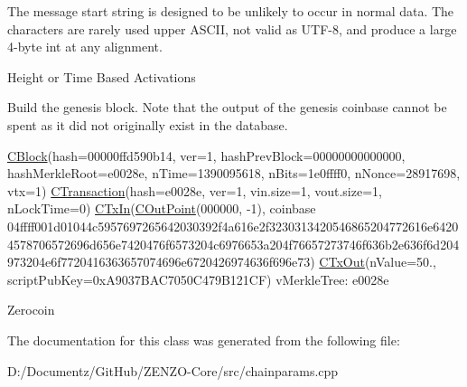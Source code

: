 The message start string is designed to be unlikely to occur in normal data. The characters are rarely used upper A\+S\+C\+II, not valid as U\+T\+F-\/8, and produce a large 4-\/byte int at any alignment.

Height or Time Based Activations

Build the genesis block. Note that the output of the genesis coinbase cannot be spent as it did not originally exist in the database.

\mbox{\hyperlink{class_c_block}{C\+Block}}(hash=00000ffd590b14, ver=1, hash\+Prev\+Block=00000000000000, hash\+Merkle\+Root=e0028e, n\+Time=1390095618, n\+Bits=1e0ffff0, n\+Nonce=28917698, vtx=1) \mbox{\hyperlink{class_c_transaction}{C\+Transaction}}(hash=e0028e, ver=1, vin.\+size=1, vout.\+size=1, n\+Lock\+Time=0) \mbox{\hyperlink{class_c_tx_in}{C\+Tx\+In}}(\mbox{\hyperlink{class_c_out_point}{C\+Out\+Point}}(000000, -\/1), coinbase 04ffff001d01044c5957697265642030392f4a616e2f3230313420546865204772616e64204578706572696d656e7420476f6573204c6976653a204f76657273746f636b2e636f6d204973204e6f7720416363657074696e6720426974636f696e73) \mbox{\hyperlink{class_c_tx_out}{C\+Tx\+Out}}(n\+Value=50., script\+Pub\+Key=0x\+A9037\+B\+A\+C7050\+C479\+B121\+CF) v\+Merkle\+Tree\+: e0028e

Zerocoin 

The documentation for this class was generated from the following file\+:\begin{DoxyCompactItemize}
\item 
D\+:/\+Documentz/\+Git\+Hub/\+Z\+E\+N\+Z\+O-\/\+Core/src/chainparams.\+cpp\end{DoxyCompactItemize}
